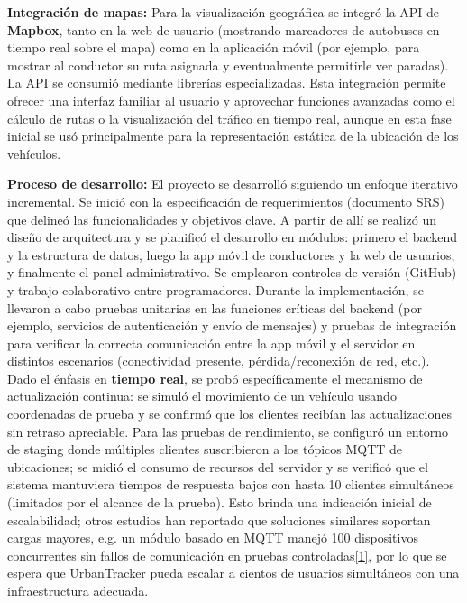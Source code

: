 \documentclass[
]{article}
\begin{document}
\textbf{Integración de mapas:} Para la visualización geográfica se
integró la API de \textbf{Mapbox}, tanto en la web de usuario (mostrando
marcadores de autobuses en tiempo real sobre el mapa) como en la
aplicación móvil (por ejemplo, para mostrar al conductor su ruta
asignada y eventualmente permitirle ver paradas). La API se consumió
mediante librerías especializadas. Esta integración permite ofrecer una
interfaz familiar al usuario y aprovechar funciones avanzadas como el
cálculo de rutas o la visualización del tráfico en tiempo real, aunque
en esta fase inicial se usó principalmente para la representación
estática de la ubicación de los vehículos.

\textbf{Proceso de desarrollo:} El proyecto se desarrolló siguiendo un
enfoque iterativo incremental. Se inició con la especificación de
requerimientos (documento SRS) que delineó las funcionalidades y
objetivos clave. A partir de allí se realizó un diseño de arquitectura y
se planificó el desarrollo en módulos: primero el backend y la
estructura de datos, luego la app móvil de conductores y la web de
usuarios, y finalmente el panel administrativo. Se emplearon controles
de versión (GitHub) y trabajo colaborativo entre programadores. Durante
la implementación, se llevaron a cabo pruebas unitarias en las funciones
críticas del backend (por ejemplo, servicios de autenticación y envío de
mensajes) y pruebas de integración para verificar la correcta
comunicación entre la app móvil y el servidor en distintos escenarios
(conectividad presente, pérdida/reconexión de red, etc.). Dado el
énfasis en \textbf{tiempo real}, se probó específicamente el mecanismo
de actualización continua: se simuló el movimiento de un vehículo usando
coordenadas de prueba y se confirmó que los clientes recibían las
actualizaciones sin retraso apreciable. Para las pruebas de rendimiento,
se configuró un entorno de staging donde múltiples clientes suscribieron
a los tópicos MQTT de ubicaciones; se midió el consumo de recursos del
servidor y se verificó que el sistema mantuviera tiempos de respuesta
bajos con hasta 10 clientes simultáneos (limitados por el alcance de la
prueba). Esto brinda una indicación inicial de escalabilidad; otros
estudios han reportado que soluciones similares soportan cargas mayores,
e.g. un módulo basado en MQTT manejó 100 dispositivos concurrentes sin
fallos de comunicación en pruebas
controladas\href{https://fliphtml5.com/lqsof/cdpg/Art\%C3\%ADculos/\#:~:text=permitiendo\%20un\%20flujo\%20de\%20datos,del\%20sistema\%20fue\%20un\%20rigurosa}{{[}1{]}},
por lo que se espera que UrbanTracker pueda escalar a cientos de
usuarios simultáneos con una infraestructura adecuada.
\end{document}

